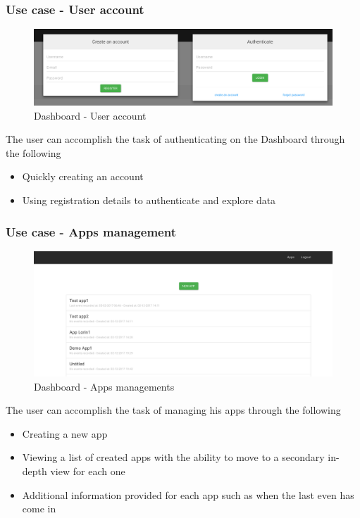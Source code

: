 \subsubsection{Use case - User account}
\begin{figure}[H]
  \centering
    \includegraphics[width=\textwidth]{dashboard-account.png} 
  \caption[Dashboard - User account]{Dashboard - User account}
\end{figure}

The user can accomplish the task of authenticating on the Dashboard through the following
\begin{itemize}
  \item Quickly creating an account
  \item Using registration details to authenticate and explore data
\end{itemize}

\subsubsection{Use case - Apps management}
\begin{figure}[H]
  \centering
    \includegraphics[width=\textwidth]{dashboard-apps.png} 
  \caption[Dashboard - Apps management]{Dashboard - Apps managements}
\end{figure}

The user can accomplish the task of managing his apps through the following
\begin{itemize}
    \item Creating a new app
  \item Viewing a list of created apps with the ability to move to a secondary in-depth view for each one
  \item Additional information provided for each app such as when the last even has come in
\end{itemize}

